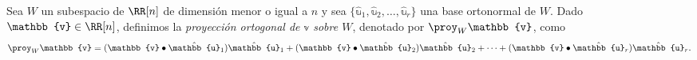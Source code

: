 \newpage

\begin{definicion}{}{}
    Sea $W$ un subespacio de $\RR[n]$ de dimensión menor o igual a $n$ y sea $\{ \hat{\mathbb{u}}_1, \hat{\mathbb{u}}_2, \dots, \hat{\mathbb{u}}_r \}$ una base ortonormal de $W$. Dado $\mathbb{v} \in \RR[n]$, definimos la \emph{proyección ortogonal de $\mathbb{v}$ sobre $W$}, denotado por $\proy_{W} \mathbb{v}$, como
    \begin{equation}
        \proy_{W} \mathbb{v} = (\mathbb{v} \bullet \hat{\mathbb{u}}_1)\hat{\mathbb{u}}_1 + (\mathbb{v} \bullet \hat{\mathbb{u}}_2)\hat{\mathbb{u}}_2 + \cdots + (\mathbb{v} \bullet \hat{\mathbb{u}}_r)\hat{\mathbb{u}}_r. \label{defdeproyeccionWpp}
    \end{equation}
\end{definicion}

